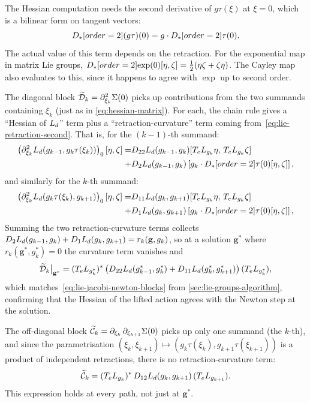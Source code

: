 The Hessian computation needs the second derivative of $g\tau(\xi)$ at $\xi = 0$, which is a bilinear form on tangent vectors:
\begin{equation}
	D_{*}[order=2]{(g \tau)}(0) = g \cdot D_{*}[order=2]{\tau}(0).
	\label{eq:lie-retraction-second}
\end{equation}
The actual value of this term depends on the retraction. For the exponential map in matrix Lie groups, $D_{*}[order=2]{\exp}(0)[\eta,\zeta] = \tfrac{1}{2}(\eta\zeta+\zeta\eta)$. The Cayley map also evaluates to this, since it happens to agree with $\exp$ up to second order.

The diagonal block $\widetilde{\mathcal{D}}_k = \pdv[order=2]{\Sigma}!{\xi_k}(0)$ picks up contributions from the two summands containing $\xi_k$ (just as in \cref{eq:hessian-matrix}).
For each, the chain rule gives a ``Hessian of $L_d$'' term plus a ``retraction-curvature'' term coming from~\eqref{eq:lie-retraction-second}.
That is, for the $(k-1)$-th summand:
\begin{align*}
	\pdv[order={2}]{L_d(g_{k-1}, g_k\tau(\xi_k))}!{\xi_k}_0 [\eta, \zeta]
	= & D_{22}{L_d(g_{k-1}, g_k)}[T_e L_{g_k} \eta,\, T_e L_{g_k} \zeta]                      \\
	+ & D_{2}{L_d(g_{k-1}, g_k)}\left[g_k \cdot D_{*}[order=2]{\tau}(0)[\eta, \zeta]\right],
\end{align*}
and similarly for the $k$-th summand:
\begin{align*}
	\pdv[order=2]{L_d(g_k \tau(\xi_k), g_{k+1})}!{\xi_k}_0 [\eta, \zeta]
	= & D_{11}{L_d(g_k, g_{k+1})}[T_e L_{g_k} \eta,\, T_e L_{g_k} \zeta]                      \\
	+ & D_{1}{L_d(g_k, g_{k+1})}\left[g_k \cdot D_{*}[order=2]{\tau}(0)[\eta, \zeta]\right],
\end{align*}
Summing the two retraction-curvature terms collects $D_{2} L_d(g_{k-1}, g_k) + D_{1} L_d(g_k, g_{k+1}) = r_k(\mathbf{g}, g_k)$, so at a solution $\mathbf{g}^*$ where $r_k(\mathbf{g}^*, g_k^*) = 0$ the curvature term vanishes and
\[
	\widetilde{\mathcal{D}}_k\big|_{\mathbf{g}^*} = (T_e L_{g_k^*})^* \left(D_{22} L_d(g_{k-1}^*, g_k^*) + D_{11} L_d(g_k^*, g_{k+1}^*)\right)(T_e L_{g_k^*}),
\]
which matches~\eqref{eq:lie-jacobi-newton-blocks} from \cref{sec:lie-groups-algorithm}, confirming that the Hessian of the lifted action agrees with the Newton step at the solution.

The off-diagonal block $\widetilde{\mathcal{C}}_k = \pdv{\Sigma}!{\xi_k, \xi_{k+1}}(0)$ picks up only one summand (the $k$-th), and since the parametrisation $(\xi_k, \xi_{k+1}) \mapsto (g_k\tau(\xi_k), g_{k+1}\tau(\xi_{k+1}))$ is a product of independent retractions, there is no retraction-curvature term:
\begin{equation}
	\widetilde{\mathcal{C}}_k = (T_e L_{g_k})^*\, D_{12} L_d(g_k, g_{k+1})\, (T_e L_{g_{k+1}}).
	\label{eq:lie-hessian-C}
\end{equation}
This expression holds at every path, not just at $\mathbf{g}^*$.

